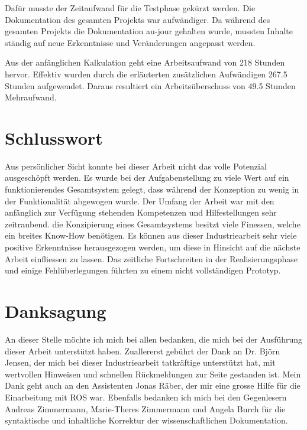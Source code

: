 Dafür musste der Zeitaufwand für die Testphase gekürzt werden.
Die Dokumentation des gesamten Projekts war aufwändiger. Da während des gesamten Projekts die Dokumentation au-jour gehalten wurde, mussten Inhalte ständig auf neue Erkenntnisse und Veränderungen angepasst werden. 

Aus der anfänglichen Kalkulation geht eine Arbeitsaufwand von 218 Stunden hervor. Effektiv wurden durch die erläuterten zusätzlichen Aufwändigen 267.5 Stunden aufgewendet. Daraus resultiert ein Arbeitsüberschuss von 49.5 Stunden Mehraufwand.

\section{Schlusswort}
Aus persönlicher Sicht konnte bei dieser Arbeit nicht das volle Potenzial ausgeschöpft werden. Es wurde bei der Aufgabenstellung zu viele Wert auf ein funktionierendes Gesamtsystem gelegt, dass während der Konzeption zu wenig in der Funktionalität abgewogen wurde. Der Umfang der Arbeit war mit den anfänglich zur Verfügung stehenden Kompetenzen und Hilfestellungen sehr zeitraubend. die Konzipierung eines Gesamtsystems besitzt viele Finessen, welche ein breites Know-How benötigen. Es können aus dieser Industriearbeit sehr viele positive Erkenntnisse herausgezogen werden, um diese in Hinsicht auf die nächste Arbeit einfliessen zu lassen. Das zeitliche Fortschreiten in der Realisierungsphase und einige Fehlüberlegungen führten zu einem nicht vollständigen Prototyp. 

\section{Danksagung}
An dieser Stelle möchte ich mich bei allen bedanken, die mich bei der Ausführung dieser Arbeit unterstützt haben. Zuallererst gebührt der Dank an Dr. Björn Jensen, der mich bei dieser Industriearbeit tatkräftige unterstützt hat, mit wertvollen Hinweisen und schnellen Rückmeldungen zur Seite gestanden ist.
Mein Dank geht auch an den Assistenten Jonas Räber, der mir eine grosse Hilfe für die Einarbeitung mit \ac{ROS} war. Ebenfalls bedanken ich mich bei den Gegenlesern Andreas Zimmermann, Marie-Theres Zimmermann und Angela Burch für die syntaktische und inhaltliche Korrektur der wissenschaftlichen Dokumentation.

